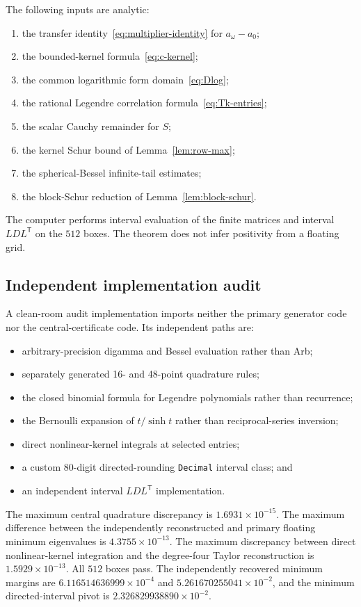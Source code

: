 \documentclass[11pt,a4paper]{article}
\theoremstyle{plain}
\theoremstyle{definition}
\numberwithin{equation}{section}
\begin{document}
The following inputs are analytic:
\begin{enumerate}[nosep]
\item the transfer identity~\eqref{eq:multiplier-identity} for $a_\omega-a_0$;
\item the bounded-kernel formula~\eqref{eq:c-kernel};
\item the common logarithmic form domain~\eqref{eq:Dlog};
\item the rational Legendre correlation formula~\eqref{eq:Tk-entries};
\item the scalar Cauchy remainder for $S$;
\item the kernel Schur bound of Lemma~\ref{lem:row-max};
\item the spherical-Bessel infinite-tail estimates;
\item the block-Schur reduction of Lemma~\ref{lem:block-schur}.
\end{enumerate}
The computer performs interval evaluation of the finite matrices and interval
$LDL^{\mathsf T}$ on the $512$ boxes. The theorem does not infer positivity
from a floating grid.

\subsection{Independent implementation audit}\label{sec:audit}

A clean-room audit implementation imports neither the primary generator code
nor the central-certificate code. Its independent paths are:
\begin{itemize}[nosep]
\item arbitrary-precision digamma and Bessel evaluation rather than Arb;
\item separately generated 16- and 48-point quadrature rules;
\item the closed binomial formula for Legendre polynomials rather than recurrence;
\item the Bernoulli expansion of $t/\sinh t$ rather than reciprocal-series inversion;
\item direct nonlinear-kernel integrals at selected entries;
\item a custom 80-digit directed-rounding \texttt{Decimal} interval class; and
\item an independent interval $LDL^{\mathsf T}$ implementation.
\end{itemize}
The maximum central quadrature discrepancy is $1.6931\times10^{-15}$. The
maximum difference between the independently reconstructed and primary
floating minimum eigenvalues is $4.3755\times10^{-13}$. The maximum
discrepancy between direct nonlinear-kernel integration and the degree-four
Taylor reconstruction is $1.5929\times10^{-13}$. All $512$ boxes pass. The
independently recovered minimum margins are
$6.116514636999\times10^{-4}$ and $5.261670255041\times10^{-2}$, and the
minimum directed-interval pivot is $2.326829938890\times10^{-2}$.
\end{document}
